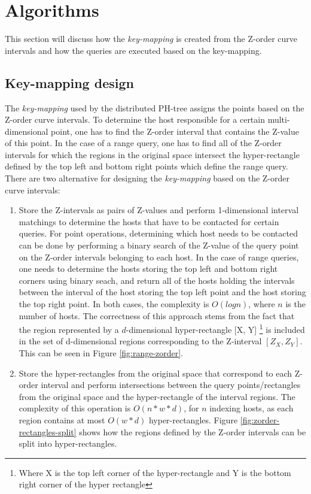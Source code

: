 \documentclass[11pt,a4paper]{globis-book}
\begin{document}
\section{Algorithms}
\label{sec:distindex-algorithms}

This section will discuss how the \textit{key-mapping} is created from the Z-order curve intervals and how the queries are executed based on the key-mapping. 
\subsection{Key-mapping design}

\label{sec:distindex-key-mapping}
The \textit{key-mapping} used by the distributed PH-tree assigns the points based on the Z-order curve intervals. To determine the host responsible for a certain multi-dimensional point, one has to find the Z-order interval that contains the Z-value of this point. In the case of a range query, one has to find all of the Z-order intervals for which the regions in the original space intersect the hyper-rectangle defined by the top left and bottom right points which define the range query. There are two alternative for designing the \textit{key-mapping} based on the Z-order curve intervals:
\begin{enumerate}
    \item Store the Z-intervals as pairs of Z-values and perform 1-dimensional interval matchings to determine the hosts that have to be contacted for certain queries. For point operations, determining which host needs to be contacted can be done by performing a binary search of the Z-value of the query point on the Z-order intervals belonging to each host. In the case of range queries, one needs to determine the hosts storing the top left and bottom right corners using binary seach, and return all of the hosts holding the intervals between the interval of the host storing the top left point and the host storing the top right point. In both cases, the complexity is $O(logn)$, where $n$ is the number of hosts. The correctness of this approach stems from the fact that the region represented by a $d$-dimensional hyper-rectangle [X, Y] \footnote{Where X is the top left corner of the hyper-rectangle and Y is the bottom right corner of the hyper rectangle} is included in the set of d-dimensional regions corresponding to the Z-interval $[Z_X,Z_Y]$. This can be seen in Figure \ref{fig:range-zorder}.
    \item Store the hyper-rectangles from the original space that correspond to each Z-order interval and perform intersections between the query points/rectangles from the original space and the hyper-rectangle of the interval regions. The complexity of this operation is $O(n * w * d)$, for $n$ indexing hosts, as each region contains at most $O(w * d)$ hyper-rectangles. Figure \ref{fig:zorder-rectangles-split} shows how the regions defined by the Z-order intervals can be split into hyper-rectangles.
\end{enumerate}
\end{document}
